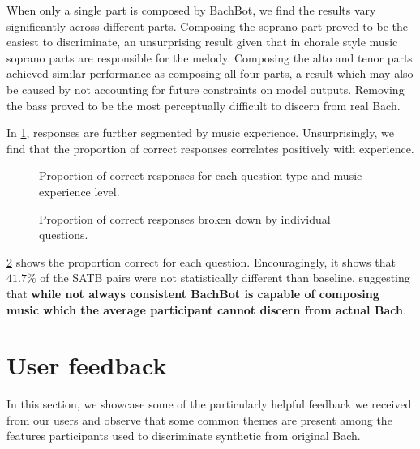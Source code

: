 When only a single part is composed by BachBot, we find the results vary significantly
across different parts. Composing the soprano part proved to be the easiest to
discriminate, an unsurprising result given that in chorale style music soprano parts
are responsible for the melody. Composing the alto and tenor parts achieved
similar performance as composing all four parts, a result which may also be caused by
not accounting for future constraints on model outputs. Removing the bass proved
to be the most perceptually difficult to discern from real Bach.

In \cref{fig:responses-mask-musicExperience}, responses are further segmented
by music experience. Unsurprisingly, we find that the proportion of correct responses
correlates positively with experience.

\begin{figure}[tb]
  \centering
  
  \caption{Proportion of correct responses for each question type and music experience level.}
  \label{fig:responses-mask-musicExperience}
\end{figure}

\begin{figure}[tb]
  \centering
  
  \caption{Proportion of correct responses broken down by individual questions.}
  \label{fig:responses-name}
\end{figure}

\cref{fig:responses-name} shows the proportion correct for each question.
Encouragingly, it shows that $41.7\%$ of the SATB pairs were not
statistically different than baseline, suggesting that \textbf{while not always
consistent BachBot is capable of composing music which the average participant
cannot discern from actual Bach}.


\section{User feedback}

In this section, we showcase some of the particularly helpful feedback we
received from our users and observe that some common themes are present among
the features participants used to discriminate synthetic from original Bach.

